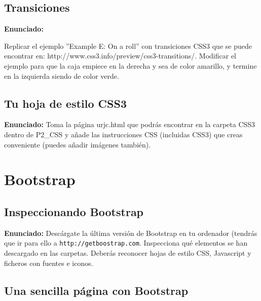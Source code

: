 \subsection{Transiciones}
\label{subsec:transiciones}

\textbf{Enunciado:}

Replicar el ejemplo ''Example E: On a roll'' con transiciones CSS3 que se puede encontrar en: http://www.css3.info/preview/css3-transitions/. Modificar el ejemplo para que la caja empiece en la derecha y sea de color amarillo, y termine en la izquierda siendo de color verde.


\subsection{Tu hoja de estilo CSS3}
\label{subsec:concurso}

\textbf{Enunciado:} Toma la página urjc.html que podrás encontrar en la carpeta CSS3 dentro de P2\_CSS y añade las instrucciones CSS (incluidas CSS3) que creas conveniente (puedes añadir imágenes también).

\section{Bootstrap}

\subsection{Inspeccionando Bootstrap}
\label{subsec:inspeccionando_bootstrap}

\textbf{Enunciado:} Descárgate la última versión de Bootstrap en tu ordenador
(tendrás que ir para ello a \verb|http://getboostrap.com|.
Inspecciona qué elementos se han descargado en las carpetas. Deberás reconocer
hojas de estilo CSS, Javascript y ficheros con fuentes e iconos.

\subsection{Una sencilla página con Bootstrap}
\label{subsec:bootstrap_sencillo}


